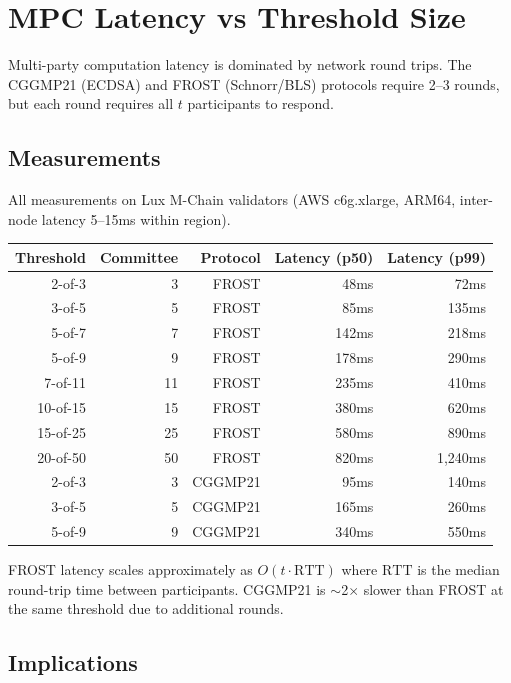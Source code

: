 \section{MPC Latency vs Threshold Size}


Multi-party computation latency is dominated by network round trips. The CGGMP21 (ECDSA) and FROST (Schnorr/BLS) protocols require 2--3 rounds, but each round requires all $t$ participants to respond.

\subsection{Measurements}

All measurements on Lux M-Chain validators (AWS c6g.xlarge, ARM64, inter-node latency 5--15ms within region).

\begin{center}
\begin{tabular}{rrrrr}
\toprule
\textbf{Threshold} & \textbf{Committee} & \textbf{Protocol} & \textbf{Latency (p50)} & \textbf{Latency (p99)} \\
\midrule
2-of-3 & 3 & FROST & 48ms & 72ms \\
3-of-5 & 5 & FROST & 85ms & 135ms \\
5-of-7 & 7 & FROST & 142ms & 218ms \\
5-of-9 & 9 & FROST & 178ms & 290ms \\
7-of-11 & 11 & FROST & 235ms & 410ms \\
10-of-15 & 15 & FROST & 380ms & 620ms \\
15-of-25 & 25 & FROST & 580ms & 890ms \\
20-of-50 & 50 & FROST & 820ms & 1,240ms \\
\midrule
2-of-3 & 3 & CGGMP21 & 95ms & 140ms \\
3-of-5 & 5 & CGGMP21 & 165ms & 260ms \\
5-of-9 & 9 & CGGMP21 & 340ms & 550ms \\
\bottomrule
\end{tabular}
\end{center}

\begin{observation}
FROST latency scales approximately as $O(t \cdot \text{RTT})$ where $\text{RTT}$ is the median round-trip time between participants. CGGMP21 is $\sim$2$\times$ slower than FROST at the same threshold due to additional rounds.
\end{observation}

\subsection{Implications}

